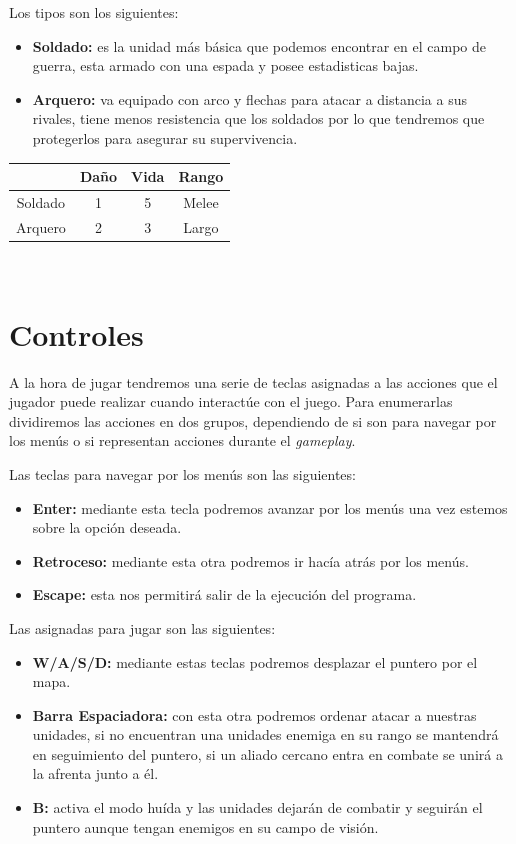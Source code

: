 Los tipos son los siguientes:
\begin{itemize}
	\item \textbf{Soldado:} es la unidad más básica que podemos encontrar en el campo de
							guerra, esta armado con una espada y posee estadisticas
							bajas.
	\item \textbf{Arquero:} va equipado con arco y flechas para atacar a distancia a
							sus rivales, tiene menos resistencia que los soldados por
							lo que tendremos que protegerlos para asegurar su
							supervivencia.
\end{itemize}

\begin{center}
\begin{tabular}{|c|c|c|c|}
\hline
        & Daño & Vida & Rango \\ 
\hline
\hline
Soldado & 1    & 5    & Melee \\ 
\hline
Arquero & 2    & 3    & Largo \\ 
\hline
\end{tabular}\\
\end{center}

\section{Controles}
A la hora de jugar tendremos una serie de teclas asignadas a las acciones que el
jugador puede realizar cuando interactúe con el juego. Para enumerarlas dividiremos las
acciones en dos grupos, dependiendo de si son para navegar por los menús o si
representan acciones durante el \textit{gameplay}.

Las teclas para navegar por los menús son las siguientes:

\begin{itemize}
	\item \textbf{Enter:} mediante esta tecla podremos avanzar por los menús una vez estemos sobre la opción deseada.
	\item \textbf{Retroceso:} mediante esta otra podremos ir hacía atrás por los menús.
	\item \textbf{Escape:} esta nos permitirá salir de la ejecución del programa.
\end{itemize}

Las asignadas para jugar son las siguientes:

\begin{itemize}
	\item \textbf{W/A/S/D:} mediante estas teclas podremos desplazar el puntero por el mapa.
	\item \textbf{Barra Espaciadora:} con esta otra podremos ordenar atacar a nuestras unidades,
									  si no encuentran una unidades enemiga en su rango se mantendrá
									  en seguimiento del puntero, si un aliado cercano entra en combate
									  se unirá a la afrenta junto a él.
	\item \textbf{B:} activa el modo huída y las unidades dejarán de combatir y seguirán el
					  puntero aunque tengan enemigos en su campo de visión.									  
\end{itemize}

